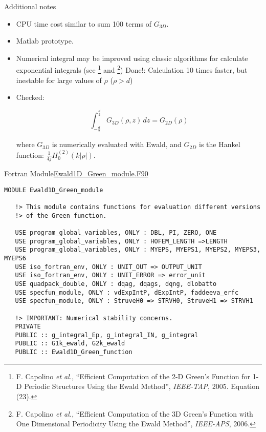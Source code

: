 \begin{frame}{Additional notes}
  \begin{itemize}
    \item CPU time cost similar to sum 100 terms of $G_{3D}$.
    \item Matlab prototype.
    \item Numerical integral may be improved using classic algorithms for 
      calculate exponential integrals (see %
        \footnote{
          F. Capolino \emph{et al.}, ``Efficient Computation of the 2-D Green's 
          Function for 1-D Periodic Structures Using the Ewald Method'', 
          \emph{IEEE-TAP}, 2005. Equation (23).
        } and
        \footnote{
          F. Capolino \emph{et al.}, ``Efficient Computation of the 3D Green's 
          Function with One Dimensional Periodicity Using the Ewald Method'', 
          \emph{IEEE-APS}, 2006.
        })
      {\color{red} Done!: Calculation 10 times faster, but inestable for large 
      values of $\rho$ ($\rho>d$)}
    \item
      Checked:

      \[
        \int_{-\frac{d}{2}}^{\frac{d}{2}}
        G_{3D}(\rho,z)\, dz
        =
        G_{2D}(\rho)
      \]

      where $G_{3D}$ is numerically evaluated with Ewald, and $G_{2D}$ is the 
      Hankel function: 
      $\frac{1}{4j} H_0^{(2)}(k|\rho|)$.

  \end{itemize}
\end{frame}


\begin{frame}{Fortran Module}{\url{Ewald1D_Green_module.F90}}


  \begin{lstlisting}[style=myFORTRANcodeS]
MODULE Ewald1D_Green_module

   !> This module contains functions for evaluation different versions
   !> of the Green function.

   USE program_global_variables, ONLY : DBL, PI, ZERO, ONE
   USE program_global_variables, ONLY : HOFEM_LENGTH =>LENGTH
   USE program_global_variables, ONLY : MYEPS, MYEPS1, MYEPS2, MYEPS3, MYEPS6
   USE iso_fortran_env, ONLY : UNIT_OUT => OUTPUT_UNIT
   USE iso_fortran_env, ONLY : UNIT_ERROR => error_unit
   USE quadpack_double, ONLY : dqag, dqags, dqng, dlobatto 
   USE specfun_module, ONLY : vdExpIntP, dExpIntP, faddeeva_erfc
   USE specfun_module, ONLY : StruveH0 => STRVH0, StruveH1 => STRVH1

   !> IMPORTANT: Numerical stability concerns.
   PRIVATE
   PUBLIC :: g_integral_Ep, g_integral_IN, g_integral
   PUBLIC :: G1k_ewald, G2k_ewald
   PUBLIC :: Ewald1D_Green_function 

  \end{lstlisting}



\end{frame}


